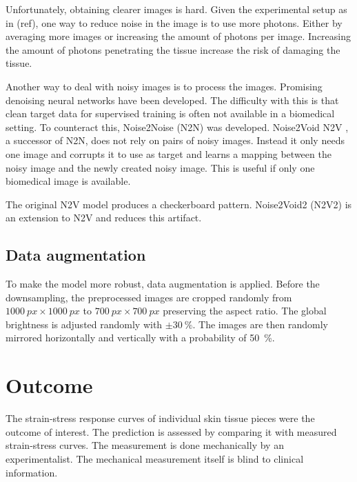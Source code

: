 Unfortunately, obtaining clearer images is hard.
Given the experimental setup as in (ref), one way to reduce noise in the image is to use more photons.
Either by averaging more images or increasing the amount of photons per image.
Increasing the amount of photons penetrating the tissue increase the risk of damaging the tissue.

Another way to deal with noisy images is to process the images.
Promising denoising neural networks have been developed.
The difficulty with this is that clean target data for supervised training is often not available in a biomedical setting.
To counteract this, Noise2Noise (N2N) \cite{Lehtinen2018} was developed.
Noise2Void N2V \cite{Krull2019}, a successor of N2N, does not rely on pairs of noisy images.
Instead it only needs one image and corrupts it to use as target and learns a mapping between the noisy image and the newly created noisy image.
This is useful if only one biomedical image is available.

The original N2V model produces a checkerboard pattern.
Noise2Void2 (N2V2) \cite{Hock2022} is an extension to N2V and reduces this artifact.

\subsection{Data augmentation}

To make the model more robust, data augmentation is applied.
Before the downsampling, the preprocessed images are cropped randomly from $\SI{1000}{px}\times \SI{1000}{px}$ to $\SI{700}{px}\times \SI{700}{px}$ preserving the aspect ratio.
The global brightness is adjusted randomly with $\pm \SI{30}{\percent}$.
The images are then randomly mirrored horizontally and vertically with a probability of \SI{50}{\percent}.

\section{Outcome}
The strain-stress response curves of individual skin tissue pieces were the outcome of interest.
The prediction is assessed by comparing it with measured strain-stress curves.
The measurement is done mechanically by an experimentalist.
The mechanical measurement itself is blind to clinical information.

